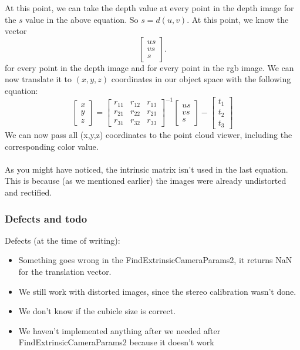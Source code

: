 At this point, we can take the depth value at every point in the depth image for
the $s$ value in the above equation. So $s = d(u,v)$. At this point, we know
the vector $$
\left[ \begin{array}{ccc} 
u s\\
v s\\
s \end{array} \right].
$$ for every point in the depth image and for every point in the rgb image. We 
can now translate it to $(x,y,z)$ coordinates in our object space with the 
following equation:
$$
\left[ \begin{array}{c} 
x\\
y\\
z\end{array} \right] 
=
\left[ \begin{array}{ccc} 
r_{11} & r_{12} & r_{13}\\
r_{21} & r_{22} & r_{23}\\
r_{31} & r_{32} & r_{33}
\end{array} \right]^{-1}
\left[ \begin{array}{c} 
u s\\
v s\\
s \end{array} \right]
-
\left[ \begin{array}{c} 
t_{1}\\
t_{2}\\
t_{3}
\end{array} \right]
$$
We can now pass all (x,y,z) coordinates to the point cloud viewer, including 
the corresponding color value. \\
\\
As you might have noticed, the intrinsic matrix isn't used in the last equation.
This is because (as we mentioned earlier) the images were already undistorted
and rectified.

\subsubsection{Defects and todo}

Defects (at the time of writing):

\begin{itemize}

\item Something goes wrong in the FindExtrinsicCameraParams2, it returns NaN for the translation vector.

\item We still work with distorted images, since the stereo calibration wasn't done.

\item We don't know if the cubicle size is correct.

\item We haven't implemented anything after we needed after FindExtrinsicCameraParams2 because it doesn't work

\end{itemize}

